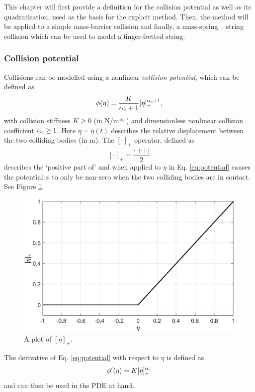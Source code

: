 This chapter will first provide a definition for the collision potential as well as its quadratisation, used as the basis for the explicit method. Then, the method will be applied to a simple mass-barrier collision and finally, a mass-spring -- string collision which can be used to model a finger-fretted string.

\subsubsection{Collision potential}
Collisions can be modelled using a nonlinear \textit{collision potential}, which can be defined as
\begin{equation}\label{eq:potential}
    \phi(\eta) = \frac{K}{\alpha_{\text{c}}+1}[\eta]_+^{\alpha_{\text{c}}+1},
\end{equation}
with collision stiffness $K \geq 0$ (in N/m$^{\alpha_{\text{c}}}$) and dimensionless nonlinear collision coefficient $\alpha_{\text{c}} \geq 1$. Here $\eta = \eta(t)$ describes the relative displacement between the two colliding bodies (in m). The $[\cdot ]_+$ operator, defined as 
\begin{equation}\label{eq:etaPlus}
    [\cdot]_+ = \frac{\cdot + |\cdot|}{2}
\end{equation}
describes the `positive part of' and when applied to $\eta$ in Eq. \eqref{eq:potential} causes the potential $\phi$ to only be non-zero when the two colliding bodies are in contact. See Figure \ref{fig:eta}.
%
\begin{figure}[h]
\centerline{\includegraphics[width=0.6\columnwidth]{figures/interactions/eta.eps}}
\caption{\label{fig:eta}{A plot of $[\eta]_+$.}}
\end{figure}

\noindent The derivative of Eq. \eqref{eq:potential} with respect to $\eta$ is defined as 
\begin{equation}\label{eq:derivPotential}
    \phi'(\eta) = K[\eta]_+^{\alpha_{\text{c}}}
\end{equation}
and can then be used in the PDE at hand. 

